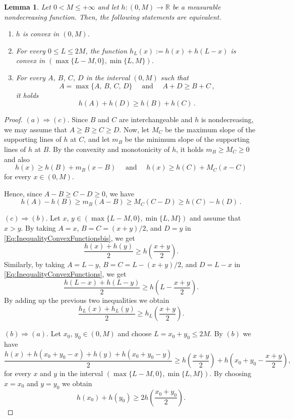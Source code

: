 \documentclass[12pt,reqno]{amsart}
\newtheorem{lemma}[theorem]{Lemma}
\theoremstyle{definition}
\theoremstyle{remark}
\newcommand{\con}[1]{\mathbb{#1}}
\newcommand{\R}{\con{R}} %
\numberwithin{equation}{section}
\begin{document}
\begin{lemma}
	\label{Lemma:ConvexFunctions}
	Let $0<M\leq +\infty$ and let $h:(0,M)\to \R$ be a measurable nondecreasing function. Then, the following statements are equivalent.
	
	\begin{enumerate}[label=(\alph*)]
		\item $h$ is convex in $(0,M)$.
		
		\item For every $0\leq L\leq 2M$, the function $h_L (x) := h(x) + h(L-x)$ is convex in $(\max \{L-M,0\}, \min \{L,M\})$.
		
		\item For every $A$, $B$, $C$, $D$ in the interval $(0,M)$ such that
		$$
		A = \max\{A,\, B,\, C,\, D\} \quad \text{ and } \quad A + D \geq B + C\,,
		$$
		it holds
		\begin{equation}
		\label{Eq:InequalityConvexFunctionsbis}
		h(A) + h(D) \geq h(B) + h(C)\,.
		\end{equation}
	\end{enumerate}
\end{lemma}

\begin{proof}
	$(a)\Rightarrow (c)$.	Since $B$ and $C$ are interchangeable and $h$ is nondecreasing, we may assume that $A \geq B \geq C \geq D$. Now, let $M_C$ be the maximum slope of the supporting lines of $h$ at $C$, and let $m_B$ be the minimum slope of the supporting lines of $h$ at $B$. By the convexity and monotonicity of $h$, it holds $m_B \geq M_C\geq 0$ and also
	$$
	h(x) \geq h(B) + m_B (x-B) \quad \text{ and } \quad h(x) \geq h(C) + M_C (x-C) 
	$$
	for every $x \in (0,M)$.
	
	Hence, since $A-B \geq C-D\geq 0$, we have
	$$
	h(A)-h(B) \geq m_B(A-B) \geq M_C (C-D) \geq h(C) - h(D)\,.
	$$
	
	$(c) \Rightarrow (b)$. Let $x$, $y\in (\max \{L-M,0\}, \min \{L,M\})$ and assume that $x>y$. By taking $A=x$, $B=C=(x+y)/2$, and $D = y$ in \eqref{Eq:InequalityConvexFunctionsbis}, we get 
	$$
	\dfrac{h(x) + h(y)}{2} \geq h \left( \dfrac{x+y}{2}\right). 
	$$ 
	Similarly, by taking $A= L-y$, $B=C=L -(x+y)/2$, and $D = L-x$ in \eqref{Eq:InequalityConvexFunctions}, we get 
	$$
	\dfrac{h(L-x) + h(L-y)}{2} \geq h \left(L - \dfrac{x+y}{2}\right). 
	$$
	By adding up the previous two inequalities we obtain
	$$
	\dfrac{h_L(x) + h_L(y)}{2} \geq h_L \left( \dfrac{x+y}{2}\right). 
	$$ 
	
	$(b) \Rightarrow (a)$. Let $x_0$, $y_0 \in (0,M)$ and choose $L = x_0 + y_0 \leq 2M$. By $(b)$ we have 
	$$
	\dfrac{h(x) + h(x_0 + y_0-x) + h(y) + h(x_0 + y_0-y)}{2} \geq h \left( \dfrac{x+y}{2}\right) + h \left(x_0 + y_0 - \dfrac{x+y}{2}\right),
	$$
	for every $x$ and $y$ in the interval $(\max \{L-M,0\}, \min \{L,M\})$. By choosing $x=x_0$ and $y=y_0$ we obtain
	$$
	h(x_0) + h(y_0)\geq 2 h \left( \dfrac{x_0+y_0}{2}\right). 
	$$
\end{proof}
\end{document}
